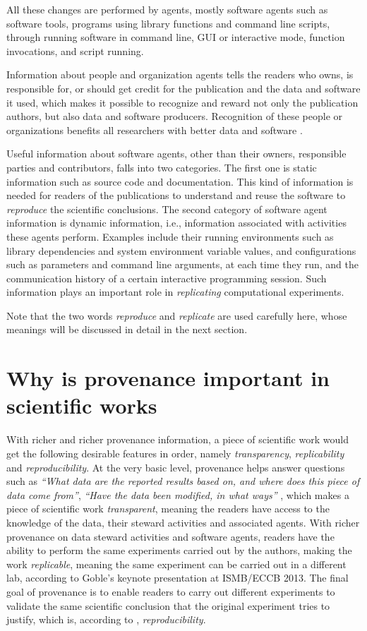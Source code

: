 All these changes are performed by agents, mostly software agents such as software tools, programs using library functions and command line scripts, through running software in command line, GUI or interactive mode, function invocations, and script running.

Information about people and organization agents tells the readers who owns, is responsible for, or should get credit for the publication and the data and software it used, which makes it possible to recognize and reward not only the publication authors, but also data and software producers. Recognition of these people or organizations benefits all researchers with better data and software \cite{parsons2010data, goble2014better}. 

Useful information about software agents, other than their owners, responsible parties and contributors, falls into two categories. The first one is static information such as source code and documentation. This kind of information is needed for readers of the publications to understand and reuse the software to \emph{reproduce} the scientific conclusions. The second category of software agent information is dynamic information, i.e., information associated with activities these agents perform. Examples include their running environments such as library dependencies and system environment variable values, and configurations such as parameters and command line arguments, at each time they run, and the communication history of a certain interactive programming session. Such information plays an important role in \emph{replicating} computational experiments.

Note that the two words \emph{reproduce} and \emph{replicate} are used carefully here, whose meanings will be discussed in detail in the next section.


\section{Why is provenance important in scientific works}
With richer and richer provenance information, a piece of scientific work would get the following desirable features in order, namely \emph{transparency}, \emph{replicability} and \emph{reproducibility}. At the very basic level, provenance helps answer questions such as \emph{``What data are the reported results based on, and where does this piece of data come from''}, \emph{``Have the data been modified, in what ways''} \cite{davidson2008provenance}, which makes a piece of scientific work \emph{transparent}, meaning the readers have access to the knowledge of the data, their steward activities and associated agents. With richer provenance on data steward activities and software agents, readers have the ability to perform the same experiments carried out by the authors, making the work \emph{replicable}, meaning the same experiment can be carried out in a different lab, according to Goble's keynote presentation at ISMB/ECCB 2013. The final goal of provenance is to enable readers to carry out different experiments to validate the same scientific conclusion that the original experiment tries to justify, which is, according to \cite{drummond2009replicability}, \emph{reproducibility}.

